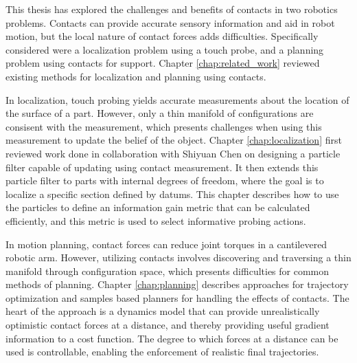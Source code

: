 \documentclass[../thesis.tex]{subfiles}
\begin{document}

This thesis has explored the challenges and benefits of contacts in two robotics problems.
Contacts can provide accurate sensory information and aid in robot motion, but the local nature of contact forces adds difficulties.
Specifically considered were a localization problem using a touch probe, and a planning problem using contacts for support.
Chapter \ref{chap:related_work} reviewed existing methods for localization and planning using contacts.

In localization, touch probing yields accurate measurements about the location of the surface of a part.
However, only a thin manifold of configurations are consisent with the measurement, which presents challenges when using this measurement to update the belief of the object.
Chapter \ref{chap:localization} first reviewed work done in collaboration with Shiyuan Chen \cite{Saund2016} on designing a particle filter capable of updating using contact measurement.
It then extends this particle filter to parts with internal degrees of freedom, where the goal is to localize a specific section defined by datums.
This chapter describes how to use the particles to define an information gain metric that can be calculated efficiently, and this metric is used to select informative probing actions.

In motion planning, contact forces can reduce joint torques in a cantilevered robotic arm.
However, utilizing contacts involves discovering and traversing a thin manifold through configuration space, which presents difficulties for common methods of planning.
Chapter \ref{chap:planning} describes approaches for trajectory optimization and samples based planners for handling the effects of contacts.
The heart of the approach is a dynamics model that can provide unrealistically optimistic contact forces at a distance, and thereby providing useful gradient information to a cost function.
The degree to which forces at a distance can be used is controllable, enabling the enforcement of realistic final trajectories.
\end{document}
